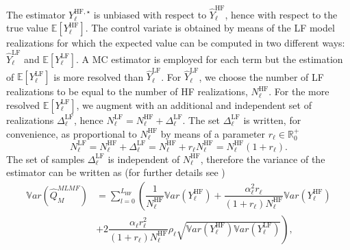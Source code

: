 The estimator $Y^{\mathrm{HF},\star}_{\ell}$ is unbiased with respect to $\hat{Y}^{\mathrm{HF}}_{\ell}$, hence with 
respect to the true value $\mathbb{E}\left[Y^{\mathrm{HF}}_{\ell}\right]$.
The control variate is obtained by means of the LF model realizations for which the expected value can be 
computed in two different ways: $\hat{Y}^{\mathrm{LF}}_{\ell}$ and $\mathbb{E}\left[Y^{\mathrm{LF}}_{\ell}\right]$. 
A MC estimator is employed for each term but the estimation of $\mathbb{E}\left[Y^{\mathrm{LF}}_{\ell}\right]$ is more resolved than $\hat{Y}^{\mathrm{LF}}_{\ell}$. For $\hat{Y}^{\mathrm{LF}}_{\ell}$, we choose the number of 
LF realizations to be equal to the number of HF realizations, $N_{\ell}^{\mathrm{HF}}$.  For the more resolved $\mathbb{E}\left[Y^{\mathrm{LF}}_{\ell}\right]$, we
augment with an additional and independent set of realizations $\Delta_{\ell}^{\mathrm{LF}}$, 
hence $N_{\ell}^{\mathrm{LF}} = N_{\ell}^{\mathrm{HF}} + \Delta_{\ell}^{\mathrm{LF}}$. The set $\Delta_{\ell}^{\mathrm{LF}}$ is
written, for convenience, as proportional to $N_{\ell}^{\mathrm{HF}}$ by means of a parameter $r_{\ell} \in \mathbb{R}^+_0$
\begin{equation}
 N_{\ell}^{\mathrm{LF}} = N_{\ell}^{\mathrm{HF}} + \Delta_{\ell}^{\mathrm{LF}} = N_{\ell}^{\mathrm{HF}} + r_{\ell} N_{\ell}^{\mathrm{HF}} 
                        = N_{\ell}^{\mathrm{HF}} (1 + r_{\ell}).
\end{equation}
The set of samples $\Delta_{\ell}^{\mathrm{LF}}$ is independent of $N_{\ell}^{\mathrm{HF}}$, therefore the variance of the 
estimator can be written as (for further details see \cite{GeraciCTR})
\begin{equation}\label{EQ: MLMF mean}
\begin{split}
\mathbb{V}ar\left(\hat{Q}_M^{MLMF}\right) &= \sum_{l=0}^{L_{\mathrm{HF}}} \left( \dfrac{1}{N_{\ell}^{\mathrm{HF}}} \mathbb{V}ar\left(Y^{\mathrm{HF}}_{\ell}\right) 
                                          + \dfrac{\alpha_\ell^2 r_\ell}{(1+r_\ell) N_{\ell}^{\mathrm{HF}}} \mathbb{V}ar\left(Y^{\mathrm{HF}}_{\ell}\right) \right. \\
              &+  \left. 2 \dfrac{\alpha_\ell r_\ell^2}{(1+r_\ell) N_{\ell}^{\mathrm{HF}}} \rho_\ell \sqrt{ \mathbb{V}ar\left(Y^{\mathrm{HF}}_{\ell}\right) 
                                                                                                      \mathbb{V}ar\left(Y^{\mathrm{LF}}_{\ell}\right) } \right),
\end{split}
\end{equation}

